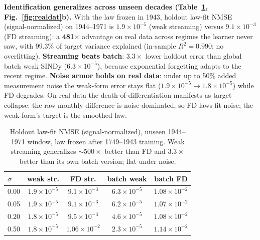 \documentclass[conference]{IEEEtran}
\begin{document}
\textbf{Identification generalizes across unseen decades (Table~\ref{tab:real-id},
Fig.~\ref{fig:realdat}b).} With the law frozen in 1943, holdout law-fit NMSE
(signal-normalized) on 1944--1971 is $1.9{\times}10^{-5}$ (weak streaming) versus
$9.1{\times}10^{-3}$ (FD streaming): a \textbf{481$\times$} advantage on real data
across regimes the learner never saw, with 99.3\% of target variance explained
(in-sample $R^2{=}0.990$; no overfitting). \textbf{Streaming beats batch}: $3.3\times$
lower holdout error than global batch weak SINDy ($6.3{\times}10^{-5}$), because
exponential forgetting adapts to the recent regime. \textbf{Noise armor holds on
real data}: under up to 50\% added measurement noise the weak-form error stays flat
($1.9{\times}10^{-5} \to 1.8{\times}10^{-5}$) while FD degrades. On real data the
death-of-differentiation manifests as target collapse: the raw monthly difference
is noise-dominated, so FD laws fit noise; the weak form's target is the smoothed law.

\begin{table}[t]
\centering\scriptsize
\caption{Holdout law-fit NMSE (signal-normalized), unseen 1944--1971 window,
law frozen after 1749--1943 training. Weak streaming generalizes ${\sim}500\times$
better than FD and $3.3\times$ better than its own batch version; flat under noise.}
\label{tab:real-id}
\begin{tabular}{lcccc}
\toprule
$\sigma$ & weak str. & FD str. & batch weak & batch FD \\
\midrule
0.00 & $1.9{\times}10^{-5}$ & $9.1{\times}10^{-3}$ & $6.3{\times}10^{-5}$ & $1.08{\times}10^{-2}$ \\
0.05 & $1.9{\times}10^{-5}$ & $9.1{\times}10^{-3}$ & $6.2{\times}10^{-5}$ & $1.07{\times}10^{-2}$ \\
0.20 & $1.8{\times}10^{-5}$ & $9.5{\times}10^{-3}$ & $4.6{\times}10^{-5}$ & $1.08{\times}10^{-2}$ \\
0.50 & $1.8{\times}10^{-5}$ & $1.06{\times}10^{-2}$ & $2.3{\times}10^{-5}$ & $1.14{\times}10^{-2}$ \\
\bottomrule
\end{tabular}
\end{table}
\end{document}
